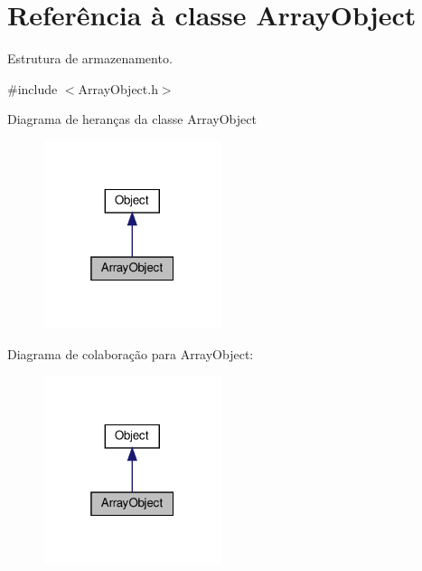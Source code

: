\hypertarget{classArrayObject}{}\section{Referência à classe Array\+Object}
\label{classArrayObject}


Estrutura de armazenamento.  




{\ttfamily \#include $<$Array\+Object.\+h$>$}



Diagrama de heranças da classe Array\+Object
\nopagebreak
\begin{figure}[H]
\begin{center}
\leavevmode
\includegraphics[width=148pt]{classArrayObject__inherit__graph}
\end{center}
\end{figure}


Diagrama de colaboração para Array\+Object\+:
\nopagebreak
\begin{figure}[H]
\begin{center}
\leavevmode
\includegraphics[width=148pt]{classArrayObject__coll__graph}
\end{center}
\end{figure}
